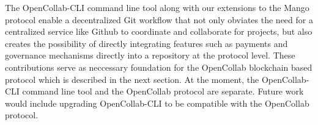 The OpenCollab-CLI command line tool along with our extensions to the Mango
protocol enable a decentralized Git workflow that not only obviates the need for a
centralized service like Github to coordinate and collaborate for projects, but
also creates the possibility of directly integrating features such as payments and
governance mechanisms directly into a repository at the protocol level. These
contributions serve as neccessary foundation for the OpenCollab blockchain based
protocol which is described in the next section. At the moment, the
OpenCollab-CLI command line tool and the OpenCollab protocol are separate.
Future work would include upgrading OpenCollab-CLI to be
compatible with the OpenCollab protocol.

